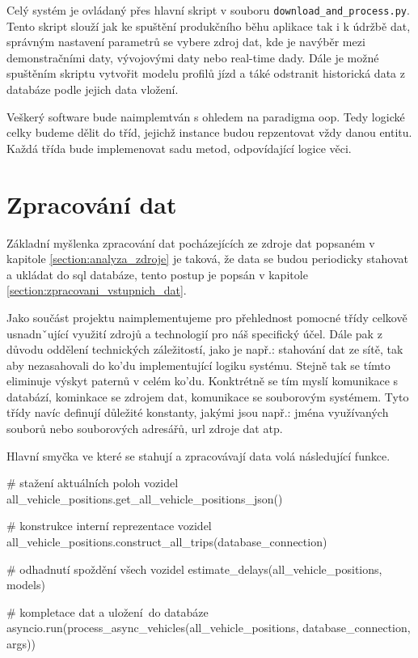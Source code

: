 \bigbreak

Celý systém je ovládaný přes hlavní skript v souboru \verb-download_and_process.py-. Tento skript slouží jak ke spuštění produkčního běhu aplikace tak i k údržbě dat, správným nastavení parametrů se vybere zdroj dat, kde je navýběr mezi demonstračními daty, vývojovými daty nebo real-time dady. Dále je možné spuštěním skriptu vytvořit modelu profilů jízd a táké odstranit historická data z databáze podle jejich data vložení.

\bigbreak

Veškerý software bude naimplemtván s ohledem na paradigma \gls{oop}. Tedy logické celky budeme dělit do tříd, jejichž instance budou repzentovat vždy danou entitu. Každá třída bude implemenovat sadu metod, odpovídající logice věci.

\section{Zpracování dat} \label{section:zpracovani_dat}

Základní myšlenka zpracování dat pocházejících ze zdroje dat popsaném v kapitole \ref{section:analyza_zdroje} je taková, že data se budou periodicky stahovat a ukládat do \gls{sql} databáze, tento postup je popsán v kapitole \ref{section:zpracovani_vstupnich_dat}.

\bigbreak

Jako součást projektu naimplementujeme pro přehlednost pomocné třídy celkově usnadnˇující využití zdrojů a technologií pro náš specifický účel. Dále pak z důvodu oddělení technických záležitostí, jako je např.: stahování dat ze sítě, tak aby nezasahovali do ko'du implementující logiku systému. Stejně tak se tímto eliminuje výskyt paternů v celém ko'du. Konktrétně se tím myslí komunikace s databází, kominkace se zdrojem dat, komunikace se souborovým systémem. Tyto třídy navíc definují důležité konstanty, jakými jsou např.: jména využívaných souborů nebo souborových adresářů, \gls{url} zdroje dat atp.

\bigbreak

Hlavní smyčka ve které se stahují a zpracovávají data volá následující funkce.

\begin{code}[frame=none]
# stažení aktuálních poloh vozidel
all_vehicle_positions.get_all_vehicle_positions_json()

# konstrukce interní reprezentace vozidel
all_vehicle_positions.construct_all_trips(database_connection)

# odhadnutí spoždění všech vozidel
estimate_delays(all_vehicle_positions, models)

# kompletace dat a uložení do databáze
asyncio.run(process_async_vehicles(all_vehicle_positions, database_connection, args))
\end{code}

